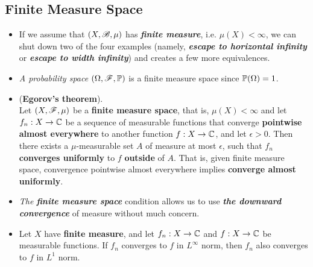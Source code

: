 \documentclass[11pt]{article}
\begin{document}
\subsection{Finite Measure Space}
\begin{itemize}
\item \begin{remark}
If we assume that $(X, {\mathscr B}, \mu)$ has \emph{\textbf{finite measure}}, i.e. $\mu(X) < \infty$, we can shut down two of the four examples (namely, \emph{\textbf{escape to horizontal infinity}} or \emph{\textbf{escape to width infinity}}) and creates a few more equivalences. 
\end{remark}

\item \begin{example}
\emph{A probability space} $(\Omega, {\mathscr F}, {\mathbb P})$ is a finite measure space since ${\mathbb P}(\Omega) = 1$.
\end{example}

\item \begin{theorem} (\textbf{Egorov's theorem}). \citep{royden1988real, tao2011introduction}\\
Let $(X, {\mathscr F}, \mu)$ be a \textbf{finite measure space}, that is, $\mu(X)<\infty$ and let  $f_n : X \rightarrow {\mathbb C}$ be a sequence of measurable functions that converge \textbf{pointwise almost everywhere} to another function $f : X \rightarrow {\mathbb C}$, and let $\epsilon > 0$. Then there exists a  $\mu$-measurable set $A$ of measure at most $\epsilon$, such that $f_n$ \textbf{converges  uniformly} to $f$ \textbf{outside} of $A$. That is, given finite measure space, convergence pointwise almost everywhere implies \textbf{converge almost uniformly}. 
\end{theorem}

\item \begin{remark}
\emph{The \textbf{finite measure space}} condition allows us to use \emph{\textbf{the downward convergence}} of measure without much concern.
\end{remark}

\item \begin{proposition}
Let $X$ have \textbf{finite measure}, and let $f_n : X \rightarrow {\mathbb C}$ and $f : X \rightarrow {\mathbb C}$ be measurable functions. If $f_n$ converges to $f$
in $L^{\infty}$ norm, then $f_n$ also converges to $f$ in $L^1$ norm.
\end{proposition}


\end{itemize}
\end{document}
